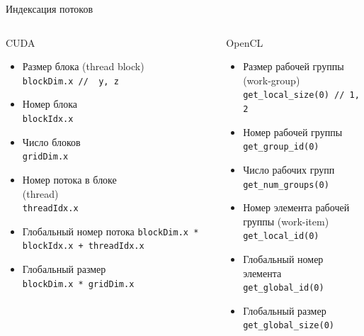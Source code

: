 \documentclass[@BEAMER_OPTIONS@]{beamer}
\newcommand{\code}[1]{\lstinline|#1|}
\begin{document}
\begin{frame}[fragile]{Индексация потоков}
    \begin{columns}
        \begin{column}{0.48\textwidth}
            \begin{block}{CUDA}
                \begin{itemize}
                    \item<1-> Размер блока (thread block) \\
                        \code{blockDim.x //  y, z}
                    \item<2-> Номер блока \\
                        \code{blockIdx.x}
                    \item<3-> Число блоков \\
                        \code{gridDim.x}
                    \item<4-> Номер потока в блоке\\ (thread) \\
                        \code{threadIdx.x}
                    \item<5-> Глобальный номер потока
                        \code{blockDim.x * blockIdx.x + threadIdx.x}
                    \item<6-> Глобальный размер \\
                        \code{blockDim.x * gridDim.x}
                \end{itemize}
            \end{block}
        \end{column}
        \begin{column}{0.48\textwidth}
            \begin{block}{OpenCL}
                \begin{itemize}
                    \item<1-> Размер рабочей группы (work-group) \\
                        \code{get_local_size(0) // 1, 2}
                    \item<2-> Номер рабочей группы \\
                        \code{get_group_id(0)}
                    \item<3-> Число рабочих групп \\
                        \code{get_num_groups(0)}
                    \item<4-> Номер элемента рабочей группы (work-item) \\
                        \code{get_local_id(0)}
                    \item<5-> Глобальный номер элемента \\
                        \code{get_global_id(0)}
                    \item<6-> Глобальный размер \\
                        \code{get_global_size(0)}
                \end{itemize}
            \end{block}
        \end{column}
    \end{columns}
\end{frame}
\end{document}
